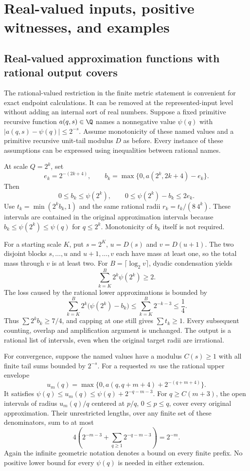\section{Real-valued inputs, positive witnesses, and examples}
\label{sec:extensions}

\subsection{Real-valued approximation functions with rational output covers}

The rational-valued restriction in the finite metric statement is convenient
for exact endpoint calculations.  It can be removed at the represented-input
level without adding an internal sort of real numbers.  Suppose a fixed
primitive recursive function $a(q,s)\in\Q$ names a nonnegative value
$\psi(q)$ with $|a(q,s)-\psi(q)|\le2^{-s}$.  Assume monotonicity of these
named values and a primitive recursive unit-tail modulus $D$ as before.
Every instance of these assumptions can be expressed using inequalities
between rational names.

At scale $Q=2^k$, set
\[
 e_k=2^{-(2k+4)},\qquad
 b_k=\max\{0,a(2^k,2k+4)-e_k\}.
\]
Then
\[
 0\le b_k\le\psi(2^k),\qquad
 0\le\psi(2^k)-b_k\le2e_k.
\]
Use $t_k=\min(2^k b_k,1)$ and the same rational radii
$r_k=t_k/(8\,4^k)$.  These intervals are contained in the original
approximation intervals because $b_k\le\psi(2^k)\le\psi(q)$ for
$q\le2^k$.  Monotonicity of $b_k$ itself is not required.

For a starting scale $K$, put $s=2^K$, $u=D(s)$ and $v=D(u+1)$.
The two disjoint blocks $s,\ldots,u$ and $u+1,\ldots,v$ each have
mass at least one, so the total mass through $v$ is at least two.
For $B=\lceil\log_2 v\rceil$, dyadic condensation yields
\[
 \sum_{k=K}^B2^k\psi(2^k)\ge2.
\]
The loss caused by the rational lower approximations is bounded by
\[
 \sum_{k=K}^B2^k\bigl(\psi(2^k)-b_k\bigr)
 \le\sum_{k=K}^B2^{-k-3}\le\frac14.
\]
Thus $\sum2^k b_k\ge7/4$, and capping at one still gives
$\sum t_k\ge1$.  Every subsequent counting, overlap and amplification
argument is unchanged.  The output is a rational list of intervals,
even when the original target radii are irrational.

For convergence, suppose the named values have a modulus $C(s)\ge1$
with all finite tail sums bounded by $2^{-s}$.  For a requested $m$ use
the rational upper envelope
\[
 u_m(q)=\max\{0,a(q,q+m+4)+2^{-(q+m+4)}\}.
\]
It satisfies $\psi(q)\le u_m(q)\le\psi(q)+2^{-q-m-3}$.
For $q\ge C(m+3)$, the open intervals of radius $u_m(q)/q$
centered at $p/q$, $0\le p\le q$, cover every original approximation.
Their unrestricted lengths, over any finite set of these denominators,
sum to at most
\[
 4\left(2^{-m-3}+\sum_{q\ge1}2^{-q-m-3}\right)
 =2^{-m}.
\]
Again the infinite geometric notation denotes a bound on every finite
prefix.  No positive lower bound for every $\psi(q)$ is needed in either
extension.

